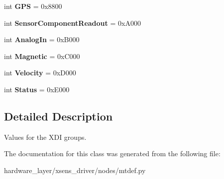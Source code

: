 \begin{DoxyCompactItemize}
int {\bfseries G\+PS} = 0x8800
\item 
\mbox{\label{classmtdef_1_1XDIGroup_a5dbef87faf4a785be3dcf331e0f9daf2}} 
int {\bfseries Sensor\+Component\+Readout} = 0x\+A000
\item 
\mbox{\label{classmtdef_1_1XDIGroup_a32dbc60499ea94d21ef594ae17a43f86}} 
int {\bfseries Analog\+In} = 0x\+B000
\item 
\mbox{\label{classmtdef_1_1XDIGroup_a52719c7438ecf85f3abcff8766fe365a}} 
int {\bfseries Magnetic} = 0x\+C000
\item 
\mbox{\label{classmtdef_1_1XDIGroup_adf5d30d0a4fd47272ac614c673e0f12c}} 
int {\bfseries Velocity} = 0x\+D000
\item 
\mbox{\label{classmtdef_1_1XDIGroup_aec0af868dced8e7e775929d0bbf489af}} 
int {\bfseries Status} = 0x\+E000
\end{DoxyCompactItemize}


\subsection{Detailed Description}
\begin{DoxyVerb}Values for the XDI groups.\end{DoxyVerb}
 

The documentation for this class was generated from the following file\+:\begin{DoxyCompactItemize}
\item 
hardware\+\_\+layer/xsens\+\_\+driver/nodes/mtdef.\+py\end{DoxyCompactItemize}
